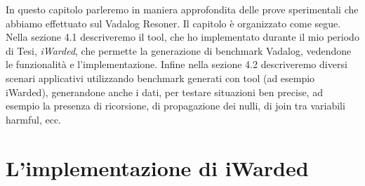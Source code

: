 In questo capitolo parleremo in maniera approfondita delle prove sperimentali che abbiamo effettuato sul Vadalog Resoner. \newline
Il capitolo è organizzato come segue. Nella sezione 4.1 descriveremo il tool, che ho implementato durante il mio periodo di Tesi, \emph{iWarded}, che permette la generazione di benchmark Vadalog, vedendone le funzionalità e l'implementazione. \newline
Infine nella sezione 4.2 descriveremo diversi scenari applicativi utilizzando benchmark generati con tool (ad esempio iWarded), generandone anche i dati, per testare situazioni ben precise, ad esempio la presenza di ricorsione, di propagazione dei nulli, di join tra variabili harmful, ecc.

\section{L'implementazione di iWarded}

